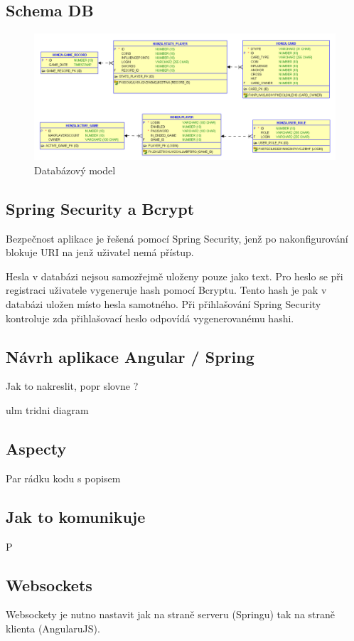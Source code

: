 \documentclass[czech,master,public,dept460,male,cpdeclaration,twoside]{diploma}
\begin{document}
\subsection{Schema DB}
\begin{figure}[H]
\centering\includegraphics[width=1\textwidth]{./Figures/DB model.png}\caption{Databázový model}
\end{figure}

\subsection{Spring Security a Bcrypt}
Bezpečnost aplikace je řešená pomocí Spring Security, jenž po nakonfigurování blokuje URI na jenž uživatel nemá přístup.

Hesla v databázi nejsou samozřejmě uloženy pouze jako text. Pro heslo se při registraci uživatele vygeneruje hash pomocí Bcryptu. Tento hash je pak v databázi uložen místo hesla samotného. Při přihlašování Spring Security kontroluje zda přihlašovací heslo odpovídá vygenerovanému hashi.

\subsection{Návrh aplikace Angular / Spring}
Jak to nakreslit, popr slovne ?

ulm tridni diagram

\subsection{Aspecty}
Par rádku kodu s popisem

\subsection{Jak to komunikuje}
P

\subsection{Websockets}
Websockety je nutno nastavit jak na straně serveru (Springu) tak na straně klienta (AngularuJS).
\end{document}
